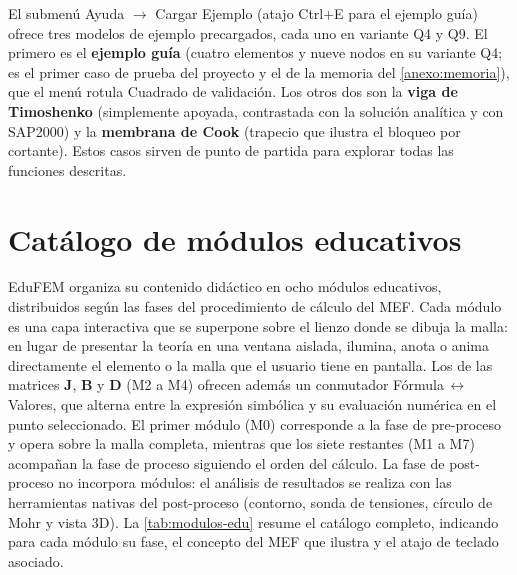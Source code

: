 El submenú \textsf{Ayuda} $\rightarrow$ \textsf{Cargar Ejemplo} (atajo Ctrl+E para el ejemplo guía) ofrece tres modelos de ejemplo precargados, cada uno en variante Q4 y Q9. El primero es el \textbf{ejemplo guía} (cuatro elementos y nueve nodos en su variante Q4; es el primer caso de prueba del proyecto y el de la memoria del \autoref{anexo:memoria}), que el menú rotula \textsf{Cuadrado de validación}. Los otros dos son la \textbf{viga de Timoshenko} (simplemente apoyada, contrastada con la solución analítica y con SAP2000) y la \textbf{membrana de Cook} (trapecio que ilustra el bloqueo por cortante). Estos casos sirven de punto de partida para explorar todas las funciones descritas.


\section{Catálogo de módulos educativos}
\label{sec:catalogo-modulos-edu}

EduFEM organiza su contenido didáctico en ocho módulos educativos, distribuidos según las fases del procedimiento de cálculo del MEF. Cada módulo es una capa interactiva que se superpone sobre el lienzo donde se dibuja la malla: en lugar de presentar la teoría en una ventana aislada, ilumina, anota o anima directamente el elemento o la malla que el usuario tiene en pantalla. Los de las matrices $\bm{J}$, $\bm{B}$ y $\bm{D}$ (M2 a M4) ofrecen además un conmutador Fórmula\,$\leftrightarrow$\,Valores, que alterna entre la expresión simbólica y su evaluación numérica en el punto seleccionado. El primer módulo (M0) corresponde a la fase de pre-proceso y opera sobre la malla completa, mientras que los siete restantes (M1 a M7) acompañan la fase de proceso siguiendo el orden del cálculo. La fase de post-proceso no incorpora módulos: el análisis de resultados se realiza con las herramientas nativas del post-proceso (contorno, sonda de tensiones, círculo de Mohr y vista 3D). La \autoref{tab:modulos-edu} resume el catálogo completo, indicando para cada módulo su fase, el concepto del MEF que ilustra y el atajo de teclado asociado.

